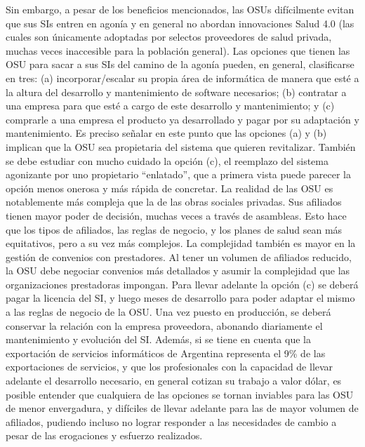 Sin embargo, a pesar de los beneficios mencionados, las OSUs difícilmente evitan que sus SIs entren en agonía y en general no abordan innovaciones Salud 4.0 (las cuales son únicamente adoptadas por selectos proveedores de salud privada, muchas veces inaccesible para la población general). Las opciones que tienen las OSU para sacar a sus SIs del camino de la agonía pueden, en general, clasificarse en tres: (a) incorporar/escalar su propia área de informática de manera que esté a la altura del desarrollo y mantenimiento de software necesarios; (b) contratar a una empresa para que esté a cargo de este desarrollo y mantenimiento; y (c) comprarle a una empresa el producto ya desarrollado y pagar por su adaptación y mantenimiento. Es preciso señalar en este punto que las opciones (a) y (b) implican que la OSU sea propietaria del sistema que quieren revitalizar. También se debe estudiar con mucho cuidado la opción (c), el reemplazo del sistema agonizante por uno propietario “enlatado”, que a primera vista puede parecer la opción menos onerosa y más rápida de concretar. La realidad de las OSU es notablemente más compleja que la de las obras sociales privadas. Sus afiliados tienen mayor poder de decisión, muchas veces a través de asambleas. Esto hace que los tipos de afiliados, las reglas de negocio, y los planes de salud sean más equitativos, pero a su vez más complejos. La complejidad también es mayor en la gestión de convenios con prestadores. Al tener un volumen de afiliados reducido, la OSU debe negociar convenios más detallados y asumir la complejidad que las organizaciones prestadoras impongan. Para llevar adelante la opción (c) se deberá pagar la licencia del SI, y luego meses de desarrollo para poder adaptar el mismo a las reglas de negocio de la OSU. Una vez puesto en producción, se deberá conservar la relación con la empresa proveedora, abonando diariamente el mantenimiento y evolución del SI. Además, si se tiene en cuenta que la exportación de servicios informáticos de Argentina representa el 9\% de las exportaciones de servicios, y que los profesionales con la capacidad de llevar adelante el desarrollo necesario, en general cotizan su trabajo a valor dólar, es posible entender que cualquiera de las opciones se tornan inviables para las OSU de menor envergadura, y difíciles de llevar adelante para las de mayor volumen de afiliados, pudiendo incluso no lograr responder a las necesidades de cambio a pesar de las erogaciones y esfuerzo realizados.

